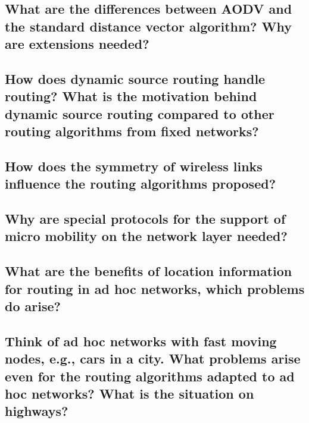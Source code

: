 \subsection{What are the differences between AODV and the standard distance vector algorithm?
Why are extensions needed?}

\subsection{How does dynamic source routing handle routing? What is the motivation behind
dynamic source routing compared to other routing algorithms from fixed networks?}

\subsection{How does the symmetry of wireless links influence the routing algorithms proposed?}

\subsection{Why are special protocols for the support of micro mobility on the network layer
needed?}

\subsection{What are the benefits of location information for routing in ad hoc networks, which
problems do arise?}

\subsection{Think of ad hoc networks with fast moving nodes, e.g., cars in a city. What problems
arise even for the routing algorithms adapted to ad hoc networks? What is the
situation on highways?}






